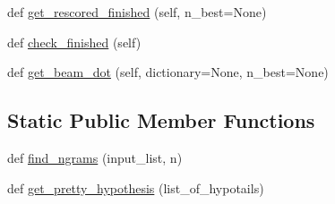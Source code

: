 \begin{DoxyCompactItemize}
\item 
def \hyperlink{classprojects_1_1controllable__dialogue_1_1controllable__seq2seq_1_1controllable__seq2seq_1_1Beam_a9cea6bd5feecf982564b84d0b774e1c1}{get\+\_\+rescored\+\_\+finished} (self, n\+\_\+best=None)
\item 
def \hyperlink{classprojects_1_1controllable__dialogue_1_1controllable__seq2seq_1_1controllable__seq2seq_1_1Beam_a80fc3ae32d64b7b1dd19944b70b3db50}{check\+\_\+finished} (self)
\item 
def \hyperlink{classprojects_1_1controllable__dialogue_1_1controllable__seq2seq_1_1controllable__seq2seq_1_1Beam_aba2e2034d56689b4d77be75d024beaef}{get\+\_\+beam\+\_\+dot} (self, dictionary=None, n\+\_\+best=None)
\end{DoxyCompactItemize}
\subsection*{Static Public Member Functions}
\begin{DoxyCompactItemize}
\item 
def \hyperlink{classprojects_1_1controllable__dialogue_1_1controllable__seq2seq_1_1controllable__seq2seq_1_1Beam_af5324f7145d2e11bbfcb44bbeda5dbec}{find\+\_\+ngrams} (input\+\_\+list, n)
\item 
def \hyperlink{classprojects_1_1controllable__dialogue_1_1controllable__seq2seq_1_1controllable__seq2seq_1_1Beam_a8790caa6448f76b870a89dab9a07e419}{get\+\_\+pretty\+\_\+hypothesis} (list\+\_\+of\+\_\+hypotails)
\end{DoxyCompactItemize}
